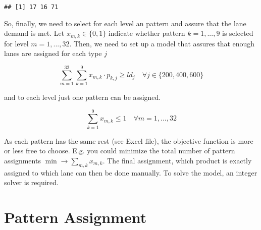 \documentclass[
]{article}
\newenvironment{Shaded}{\begin{snugshade}}{\end{snugshade}}
\newcommand{\CommentTok}[1]{\textcolor[rgb]{0.56,0.35,0.01}{\textit{#1}}}
\newcommand{\DecValTok}[1]{\textcolor[rgb]{0.00,0.00,0.81}{#1}}
\newcommand{\KeywordTok}[1]{\textcolor[rgb]{0.13,0.29,0.53}{\textbf{#1}}}
\newcommand{\NormalTok}[1]{#1}
\newcommand{\OperatorTok}[1]{\textcolor[rgb]{0.81,0.36,0.00}{\textbf{#1}}}
\newcommand{\StringTok}[1]{\textcolor[rgb]{0.31,0.60,0.02}{#1}}
\begin{document}
\begin{Shaded}
\end{Shaded}

\begin{verbatim}
## [1] 17 16 71
\end{verbatim}

So, finally, we need to select for each level an pattern and assure that
the lane demand is met. Let \(x_{m,k} \in \{0,1\}\) indicate whether
pattern \(k=1,...,9\) is selected for level \(m= 1,...,32\). Then, we
need to set up a model that assures that enough lanes are assigned for
each type \(j\)

\[ \sum_{m = 1}^{32}\sum_{k = 1}^9 x_{m,k} \cdot p_{k,j} \geq ld_j \quad \forall j \in \{200,400,600\}\]

and to each level just one pattern can be assigned.

\[ \sum_{k = 1}^9 x_{m,k} \leq 1 \quad \forall m = 1,...,32\]

As each pattern has the same rest (see Excel file), the objective
function is more or less free to choose. E.g. you could minimize the
total number of pattern assignments
\(\min \rightarrow \sum_{m,k} x_{m,k}\). The final assignment, which
product is exactly assigned to which lane can then be done manually. To
solve the model, an integer solver is required.

\hypertarget{pattern-assignment}{%
\section{Pattern Assignment}\label{pattern-assignment}}
\end{document}
